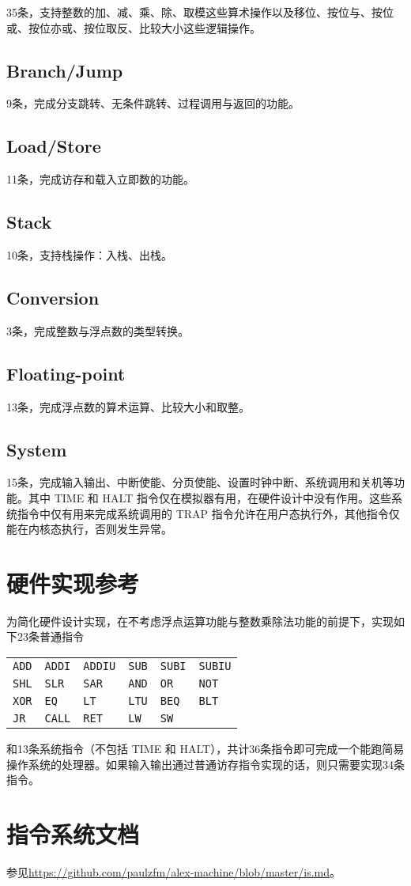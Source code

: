 \documentclass[11pt, a4paper]{article}
\renewcommand{\t}{\texttt}
\begin{document}
35条，支持整数的加、减、乘、除、取模这些算术操作以及移位、按位与、按位或、按位亦或、按位取反、比较大小这些逻辑操作。

\subsection{Branch/Jump}

9条，完成分支跳转、无条件跳转、过程调用与返回的功能。

\subsection{Load/Store}

11条，完成访存和载入立即数的功能。

\subsection{Stack}

10条，支持栈操作：入栈、出栈。

\subsection{Conversion}

3条，完成整数与浮点数的类型转换。

\subsection{Floating-point}

13条，完成浮点数的算术运算、比较大小和取整。

\subsection{System}

15条，完成输入输出、中断使能、分页使能、设置时钟中断、系统调用和关机等功能。其中 TIME 和 HALT 指令仅在模拟器有用，在硬件设计中没有作用。这些系统指令中仅有用来完成系统调用的 TRAP 指令允许在用户态执行外，其他指令仅能在内核态执行，否则发生异常。

\section{硬件实现参考}

为简化硬件设计实现，在不考虑浮点运算功能与整数乘除法功能的前提下，实现如下23条普通指令

\begin{center}
\begin{tabular}{llllll}
    \t{ADD} & \t{ADDI} & \t{ADDIU} & \t{SUB} & \t{SUBI} & \t{SUBIU} \\
    \t{SHL} & \t{SLR} & \t{SAR} & \t{AND} & \t{OR} & \t{NOT} \\
    \t{XOR} & \t{EQ} & \t{LT} & \t{LTU} & \t{BEQ} & \t{BLT} \\
    \t{JR}  & \t{CALL} & \t{RET} & \t{LW} & \t{SW} & \\
\end{tabular}
\end{center}
和13条系统指令（不包括 TIME 和 HALT），共计36条指令即可完成一个能跑简易操作系统的处理器。如果输入输出通过普通访存指令实现的话，则只需要实现34条指令。

\section{指令系统文档}

参见\url{https://github.com/paulzfm/alex-machine/blob/master/is.md}。
\end{document}
